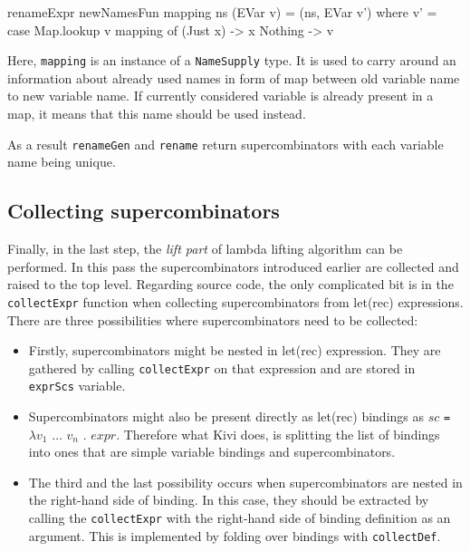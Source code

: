 \documentclass[12pt,a4paper]{report}
\begin{document}
\vspace*{0.2in}
\begin{code}[style=haskell]
renameExpr newNamesFun mapping ns (EVar v) =
    (ns, EVar v')
    where
        v' = case Map.lookup v mapping of
            (Just x) -> x
            Nothing -> v
\end{code}

Here, \texttt{mapping} is an instance of a \texttt{NameSupply} type. It is used
to carry around an information about already used names in form of map between
old variable name to new variable name. If currently considered variable is
already present in a map, it means that this name should be used instead.

As a result \texttt{renameGen} and \texttt{rename} return supercombinators with
each variable name being unique.

\subsection{Collecting supercombinators}
Finally, in the last step, the \textit{lift part}  of lambda lifting algorithm
can be performed. In this pass the supercombinators introduced earlier are
collected and raised to the top level.  Regarding source code, the only
complicated bit is in the \texttt{collectExpr} function when collecting
supercombinators from let(rec) expressions. There are three possibilities
where supercombinators need to be collected:

\begin{itemize}
  \item Firstly, supercombinators might be nested in let(rec)
    expression. They are gathered by calling \texttt{collectExpr} on that
    expression and are stored in \texttt{exprScs} variable.
  \item Supercombinators might also be present directly as let(rec)
    bindings as $sc$ \texttt{=} $\lambda v_1$ $\ldots$ $v_n$ . $expr$.
    Therefore what Kivi does, is splitting the list of bindings into ones that
    are simple variable bindings and supercombinators.
  \item The third and the last possibility occurs when supercombinators are
    nested in the right-hand side of binding. In this case, they should be
    extracted by calling the \texttt{collectExpr} with the right-hand side of
    binding definition as an argument. This is implemented by folding over
    bindings with \texttt{collectDef}.
\end{itemize}
\end{document}
